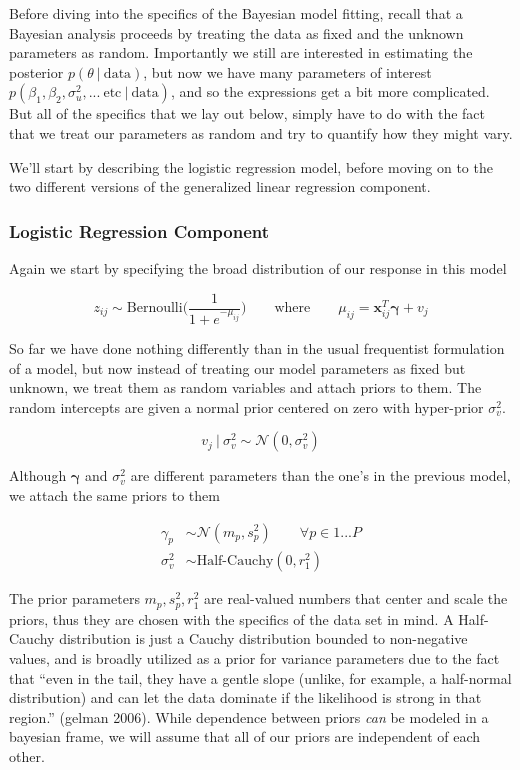 \documentclass[12pt,twoside]{reedthesis}
\begin{document}
Before diving into the specifics of the Bayesian model fitting, recall that a Bayesian analysis proceeds by treating the data as fixed and the unknown parameters as random. Importantly we still are interested in estimating the posterior \(p(\theta \ | \ \text{data})\), but now we have many parameters of interest \(p(\beta_1, \beta_2, \sigma^2_u, ... \ \text{etc} \ | \ \text{data})\), and so the expressions get a bit more complicated. But all of the specifics that we lay out below, simply have to do with the fact that we treat our parameters as random and try to quantify how they might vary.

We'll start by describing the logistic regression model, before moving on to the two different versions of the generalized linear regression component.

\hypertarget{logistic-regression-component}{%
\subsubsection{Logistic Regression Component}\label{logistic-regression-component}}

Again we start by specifying the broad distribution of our response in this model

\[
z_{ij} \sim \text{Bernoulli}\Bigg(\frac{1}{1 + e^{-\mu_{ij}}}\Bigg) \qquad \text{where} \qquad \mu_{ij} =\mathbf{x}_{ij}^T\boldsymbol{\gamma} + v_j
\]

So far we have done nothing differently than in the usual frequentist formulation of a model, but now instead of treating our model parameters as fixed but unknown, we treat them as random variables and attach priors to them. The random intercepts are given a normal prior centered on zero with hyper-prior \(\sigma_v^2\).

\[
v_j \ | \ \sigma_v^2 \sim \mathcal{N}(0, \sigma_v^2)
\]

Although \(\boldsymbol{\gamma}\) and \(\sigma_v^2\) are different parameters than the one's in the previous model, we attach the same priors to them

\[
\begin{aligned}
\gamma_p &\sim \mathcal{N}(m_p, s_p^2)  \qquad \forall p\in 1...P \\
\sigma_v^2 &\sim \text{Half-Cauchy}(0, r_1^2)
\end{aligned}
\]

The prior parameters \(m_p, s_p^2, r_1^2\) are real-valued numbers that center and scale the priors, thus they are chosen with the specifics of the data set in mind. A Half-Cauchy distribution is just a Cauchy distribution bounded to non-negative values, and is broadly utilized as a prior for variance parameters due to the fact that ``even in the tail, they have a gentle slope (unlike, for example, a half-normal distribution) and can let the data dominate if the likelihood is strong in that region.'' (gelman 2006). While dependence between priors \emph{can} be modeled in a bayesian frame, we will assume that all of our priors are independent of each other.
\end{document}
